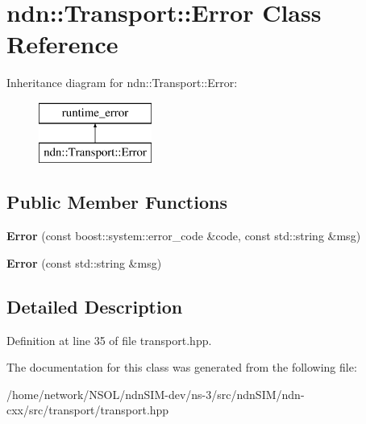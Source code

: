 \hypertarget{classndn_1_1Transport_1_1Error}{}\section{ndn\+:\+:Transport\+:\+:Error Class Reference}
\label{classndn_1_1Transport_1_1Error}
Inheritance diagram for ndn\+:\+:Transport\+:\+:Error\+:\begin{figure}[H]
\begin{center}
\leavevmode
\includegraphics[height=2.000000cm]{classndn_1_1Transport_1_1Error}
\end{center}
\end{figure}
\subsection*{Public Member Functions}
\begin{DoxyCompactItemize}
\item 
{\bfseries Error} (const boost\+::system\+::error\+\_\+code \&code, const std\+::string \&msg)\hypertarget{classndn_1_1Transport_1_1Error_a3befd1191d0e488125c3f183af3bc96b}{}\label{classndn_1_1Transport_1_1Error_a3befd1191d0e488125c3f183af3bc96b}

\item 
{\bfseries Error} (const std\+::string \&msg)\hypertarget{classndn_1_1Transport_1_1Error_aff4dd40b902e34e6085e6fd4a1e8f16b}{}\label{classndn_1_1Transport_1_1Error_aff4dd40b902e34e6085e6fd4a1e8f16b}

\end{DoxyCompactItemize}


\subsection{Detailed Description}


Definition at line 35 of file transport.\+hpp.



The documentation for this class was generated from the following file\+:\begin{DoxyCompactItemize}
\item 
/home/network/\+N\+S\+O\+L/ndn\+S\+I\+M-\/dev/ns-\/3/src/ndn\+S\+I\+M/ndn-\/cxx/src/transport/transport.\+hpp\end{DoxyCompactItemize}
